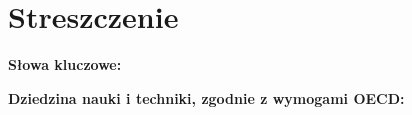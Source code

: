 \chapter*{Streszczenie}
\textbf{Słowa kluczowe:} 

\textbf{Dziedzina nauki i techniki, zgodnie z wymogami OECD:} 
